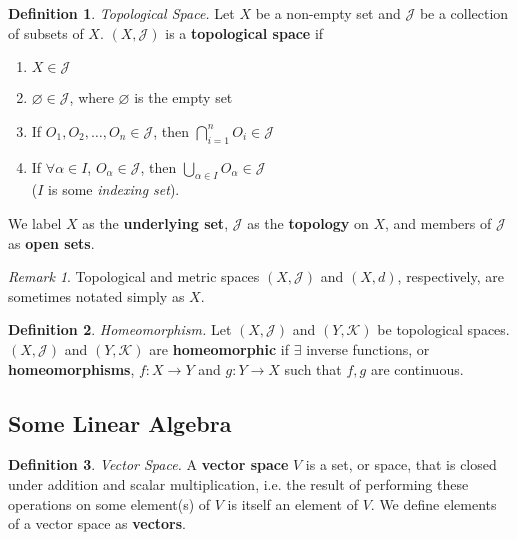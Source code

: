\documentclass[10pt,landscape]{article}
\theoremstyle{definition}
\newtheorem{definition}{Definition}[section]
\theoremstyle{theorem}
\theoremstyle{summary}
\theoremstyle{remark}
\newtheorem*{remark}{Remark}
\begin{document}
\begin{multicols*}{3}
\theoremstyle{definition}
\begin{definition}{\textit{Topological Space.}}
Let $X$ be a non-empty set and $\mathcal{J}$ be a collection of subsets of $X$. $(X, \mathcal{J})$ is a \textbf{topological space} if
\begin{enumerate}
    \item $X \in \mathcal{J}$
    \item $\varnothing \in \mathcal{J}$, where $\varnothing$ is the empty set
    \item If $O_1, O_2, \ldots , O_n \in \mathcal{J}$, then $\bigcap_{i=1}^nO_i\in\mathcal{J}$
    \item If $\forall \alpha \in I$, $O_\alpha\in\mathcal{J}$, then $\bigcup_{\alpha\in I}O_\alpha\in\mathcal{J}$ \\($I$ is some \textit{indexing set}).
\end{enumerate}
We label $X$ as the \textbf{underlying set}, $\mathcal{J}$ as the \textbf{topology} on $X$, and members of $\mathcal{J}$ as \textbf{open sets}.

\end{definition}

\begin{remark}
Topological and metric spaces $(X,\mathcal{J})$ and $(X, d)$, respectively, are sometimes notated simply as $X$.
\end{remark}

\theoremstyle{definition}
\begin{definition}{\textit{Homeomorphism.}}
Let $(X,\mathcal{J})$ and $(Y, \mathcal{K})$ be topological spaces. $(X,\mathcal{J})$ and $(Y, \mathcal{K})$ are \textbf{homeomorphic} if $\exists$ inverse functions, or \textbf{homeomorphisms}, $f:X\rightarrow Y$ and $g:Y\rightarrow X$ such that $f, g$ are continuous.
\end{definition}

\subsection{Some Linear Algebra}
\theoremstyle{definition}
\begin{definition}{\textit{Vector Space.}}
A \textbf{vector space} $V$ is a set, or space, that is closed under addition and scalar multiplication, i.e. the result of performing these operations on some element(s) of $V$ is itself an element of $V$. We define elements of a vector space as \textbf{vectors}.
\end{definition}


\end{multicols*}
\end{document}
